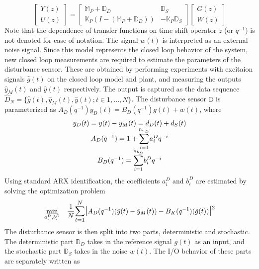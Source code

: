 \documentclass[letterpaper, 10 pt, conference]{ieeeconf}  %
\begin{document}
\begin{enumerate}
\begin{equation}
	\begin{bmatrix}
		Y(z) \\ U(z)
	 \end{bmatrix} = 
	 \begin{bmatrix} 
	 \mathbb{M}_P+\mathbb{D}_D & \mathbb{D}_S \\
	 \mathbb{K}_P(I-(\mathbb{M}_P+\mathbb{D}_D)) &  -\mathbb{K}_P\mathbb{D}_S
	 \end{bmatrix}
	 \begin{bmatrix}
	 G(z) \\ W(z)
	 \end{bmatrix}
	 \label{TF}
	\end{equation}
	Note that the dependence of transfer functions on time shift operator $z$ (or $q^{-1}$) is not denoted for ease of notation. The signal $w(t)$ is interpreted as an external noise signal. 
	Since this model represents the closed loop behavior of the system, new closed loop measurements are required to estimate the parameters of the disturbance sensor. These are obtained by performing experiments with excitaion signals $\hat{g}(t)$ on the closed loop model and plant, and measuring the outputs $\hat{y}_M(t)$ and $\hat{y}(t)$ respectively. The output is captured as the data sequence $\hat{D}_{N}=\{\hat{g}(t),\hat{y}_M(t),\hat{y}(t);t\in{1,...,N}\}$.
	The disturbance sensor $\mathbb{D}$ is parameterized as $A_D(q^{-1})y_D(t) = B_D(q^{-1})g(t)+w(t)$, where 
	\begin{equation*}
	\begin{matrix}
	y_D(t) = y(t) - y_M(t) = d_D(t)+d_S(t) \\ 
	A_D(q^{-1}) = 1+\mathlarger{\sum\limits_{i=1}^{n_{a_D}}}a_i^Dq^{-i}\\
	B_D(q^{-1}) = \mathlarger{\sum\limits_{i=1}^{n_{b_D}}}b_i^Dq^{-i}
	\end{matrix}  
	\end{equation*}
	Using standard ARX identification, the coefficients $a_i^D$ and $b_i^D$ are estimated by solving the optimization problem
	\begin{equation*}
	\begin{aligned}
	& \underset{a_i^D,b_i^D}{\text{min}}
	& & \frac{1}{N}\mathlarger{\sum\limits_{t=1}^N}\mathlarger{\mathlarger{|}}A_D(q^{-1})(\hat{y}(t)-\hat{y}_M(t))-B_K(q^{-1})(\hat{g}(t))\mathlarger{\mathlarger{|}}^2 \\
	\end{aligned}
	\end{equation*}
	The disturbance sensor is then split into two parts, deterministic and stochastic. The deterministic part $\mathbb{D}_D$ takes in the reference signal $g(t)$ as an input, and the stochastic part $\mathbb{D}_S$ takes in the noise $w(t)$. The I/O behavior of these parts are separately written as 

\end{enumerate}
\end{document}
